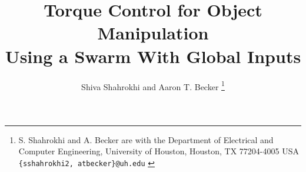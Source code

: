 \documentclass[letterpaper, 10 pt, conference]{ieeeconf}
\begin{document}


\title{\LARGE \bf 
Torque Control for Object Manipulation\\ Using a Swarm With Global Inputs
}
\author{Shiva Shahrokhi and  Aaron T. Becker%
\thanks{{S. Shahrokhi and A. Becker are with the Department of Electrical and Computer Engineering,  University of Houston, Houston, TX 77204-4005 USA {\tt\small  \{sshahrokhi2, atbecker\}@uh.edu}
}
} %
} %
\maketitle
\end{document}
